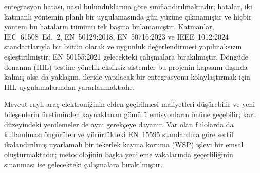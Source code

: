 entegrasyon hatası, nasıl bulunduklarına göre sınıflandırılmaktadır; hatalar, iki katmanlı yöntemin planlı bir uygulamasında gün yüzüne çıkmamıştır ve hiçbir yöntem bu hataların tümünü tek başına bulamamıştır. Katmanlar, IEC~61508~Ed.~2, EN~50129:2018, EN~50716:2023 ve IEEE~1012:2024 standartlarıyla bir bütün olarak ve uygunluk değerlendirmesi yapılmaksızın eşleştirilmiştir; EN~50155:2021 gelecekteki çalışmalara bırakılmıştır. Döngüde donanım (HIL) testine yönelik eksiksiz sistemler bu projenin kapsamı dışında kalmış olsa da yaklaşım, ileride yapılacak bir entegrasyonu kolaylaştırmak için HIL uygulamalarından yararlanmaktadır.

Mevcut raylı araç elektroniğinin elden geçirilmesi maliyetleri düşürebilir ve yeni bileşenlerin üretiminden kaynaklanan gömülü emisyonların önüne geçebilir; kart düzeyindeki yenilemeler de aynı gerekçeye dayanır. Var olan f\kern0pt i\-lo\-larda da kullanılması öngörülen ve yürürlükteki EN~15595 standardına göre ser\-ti\-f\kern0pt i\-ka\-lan\-dı\-rıl\-mış uyarlamalı bir tekerlek kayma koruma (WSP) işlevi bir emsal oluşturmaktadır; metodolojinin başka yenileme vakalarında geçerliliğinin sınanması ise gelecekteki çalışmalara bırakılmıştır.
